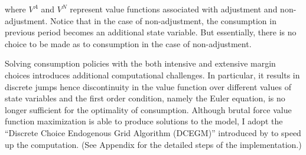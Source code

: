 where $V^A$ and $V^N$ represent value functions associated with adjustment and non-adjustment. Notice that in the case of non-adjustment, the consumption in previous period becomes an additional state variable. But essentially, there is no choice to be made as to consumption in the case of non-adjustment. 

Solving consumption policies with the both intensive and extensive margin choices introduces additional computational challenges. In particular, it results in discrete jumps hence discontinuity in the value function over different values of state variables and the first order condition, namely the Euler equation, is no longer sufficient for the optimality of consumption. Although brutal force value function maximization is able to produce solutions to the model, I adopt the ``Discrete Choice Endogenous Grid Algorithm (DCEGM)'' introduced by \cite{iskhakov2017endogenous} to speed up the computation. (See Appendix for the detailed steps of the implementation.)

